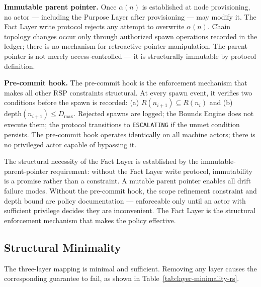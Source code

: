 \medskip
\noindent\textbf{Immutable parent pointer.} Once $\alpha(n)$ is established at node provisioning, no actor --- including the Purpose Layer after provisioning --- may modify it. The Fact Layer write protocol rejects any attempt to overwrite $\alpha(n)$. Chain topology changes occur only through authorized spawn operations recorded in the ledger; there is no mechanism for retroactive pointer manipulation. The parent pointer is not merely access-controlled --- it is structurally immutable by protocol definition.

\medskip
\noindent\textbf{Pre-commit hook.} The pre-commit hook is the enforcement mechanism that makes all other RSP constraints structural. At every spawn event, it verifies two conditions before the spawn is recorded: (a) $R(n_{i+1}) \subseteq R(n_i)$ and (b) $\mathrm{depth}(n_{i+1}) \leq D_{\mathrm{max}}$. Rejected spawns are logged; the Bounds Engine does not execute them; the protocol transitions to \texttt{ESCALATING} if the unmet condition persists. The pre-commit hook operates identically on all machine actors; there is no privileged actor capable of bypassing it.

The structural necessity of the Fact Layer is established by the immutable-parent-pointer requirement: without the Fact Layer write protocol, immutability is a promise rather than a constraint. A mutable parent pointer enables all drift failure modes. Without the pre-commit hook, the scope refinement constraint and depth bound are policy documentation --- enforceable only until an actor with sufficient privilege decides they are inconvenient. The Fact Layer is the structural enforcement mechanism that makes the policy effective.

\subsection{Structural Minimality}
\label{sec:rs-minimality}

The three-layer mapping is minimal and sufficient. Removing any layer causes the corresponding guarantee to fail, as shown in Table~\ref{tab:layer-minimality-rs}.

